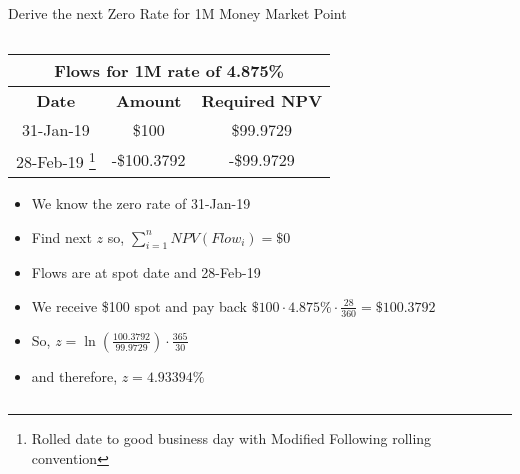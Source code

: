 \documentclass[handout, aspectratio=169]{beamer}
\begin{document}
\begin{frame}{Derive the next Zero Rate for 1M Money Market Point}
\begin{columns}[T]
		\begin{column}{0.7\textwidth}
			\begin{table}[t]
				\centering
				\begin{adjustbox}{max width=0.55\textwidth}
					\begin{tabular}{|c|c|c|} 
						\hline
						\multicolumn{3}{|c|}{\textbf{Flows for 1M rate of 4.875\%}} \\
						\hline
						\textbf{Date} & \textbf{Amount}  & \textbf{Required NPV}\\				
						\hline
						31-Jan-19 & \$100 & \$99.9729 \\
						\hline
						28-Feb-19 \footnote{\tiny Rolled date to good business day with Modified Following rolling convention} & -\$100.3792 & -\$99.9729 \\
						\hline
					\end{tabular}
				\end{adjustbox}
			\end{table}
			\begin{itemize}
				\footnotesize
				\item We know the zero rate of 31-Jan-19
				\item Find next $z$ so, $\sum_{i=1}^{n} NPV(Flow_i) = \$0$
				\item Flows are at spot date and 28-Feb-19
				\item We receive \$100 spot and pay back $\$100 \cdot 4.875\% \cdot \frac{28}{360} = \$100.3792$
				\item So, $z = \ln(\frac{100.3792}{99.9729}) \cdot \frac{365}{30}$
				\item and therefore, $z = 4.93394\%$
			\end{itemize}
		 \end{column}
	\end{columns}
\end{frame}
\end{document}
